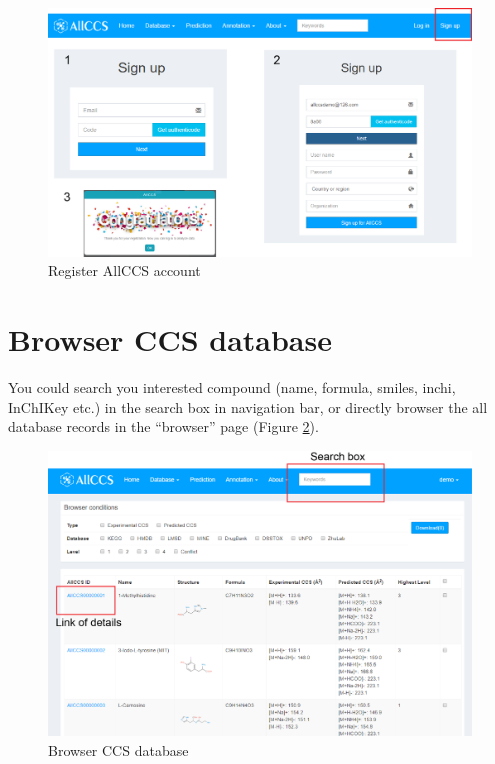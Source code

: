 \documentclass[12pt,]{book}
\begin{document}
\begin{figure}

{\centering \includegraphics{images/chapter1/register_1} 

}

\caption{Register AllCCS account}\label{fig:FigRegister}
\end{figure}

\section{Browser CCS database}\label{chaptere1d2}

You could search you interested compound (name, formula, smiles, inchi,
InChIKey etc.) in the search box in navigation bar, or directly browser
the all database records in the ``browser'' page (Figure
\ref{fig:FigBrowser1}).

\begin{figure}

{\centering \includegraphics{images/chapter1/browser_1} 

}

\caption{Browser CCS database}\label{fig:FigBrowser1}
\end{figure}
\end{document}
